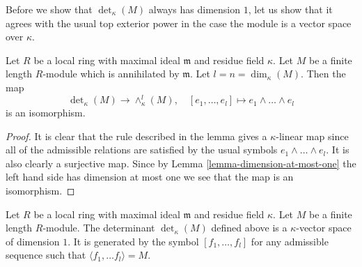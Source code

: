 \noindent
Before we show that $\det_\kappa(M)$ always has dimension $1$,
let us show that it agrees with the usual top exterior power in
the case the module is a vector space over $\kappa$.

\begin{lemma}
\label{lemma-compare-det}
Let $R$ be a local ring with maximal ideal $\mathfrak m$ and
residue field $\kappa$. Let $M$ be a finite length $R$-module
which is annihilated by $\mathfrak m$. Let $l = n = \dim_\kappa(M)$.
Then the map
$$
\det\nolimits_\kappa(M) \longrightarrow \wedge^l_\kappa(M),
\quad
[e_1, \ldots, e_l] \longmapsto e_1 \wedge \ldots \wedge e_l
$$
is an isomorphism.
\end{lemma}

\begin{proof}
It is clear that the rule described in the lemma gives a $\kappa$-linear
map since all of the admissible relations are satisfied by the usual
symbols $e_1 \wedge \ldots \wedge e_l$. It is also clearly a surjective
map. Since by Lemma \ref{lemma-dimension-at-most-one} the left hand side
has dimension at most one
we see that the map is an isomorphism.
\end{proof}

\begin{lemma}
\label{lemma-determinant-dimension-one}
Let $R$ be a local ring with maximal ideal $\mathfrak m$ and
residue field $\kappa$. Let $M$ be a finite length $R$-module.
The determinant $\det_\kappa(M)$ defined above is a $\kappa$-vector
space of dimension $1$. It is generated by the symbol
$[f_1, \ldots, f_l]$ for any admissible sequence such
that $\langle f_1, \ldots f_l \rangle = M$.
\end{lemma}

